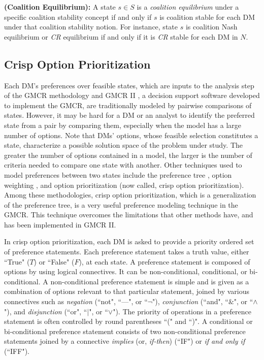 \begin{definition}\label{def-ce}
\rm {\bf (Coalition Equilibrium):} A state $s \in S$ is a \emph{coalition equilibrium} under a specific coalition stability concept if and only if $s$ is coalition stable for each DM under that coalition stability notion. For instance, state $s$ is coalition Nash equilibrium or \emph{CR} equilibrium if and only if it is \emph{CR} stable for each DM in $N$.
\end{definition}

\subsection{Crisp Option Prioritization}\label{crisp-opn-prioritization}

Each DM's preferences over feasible states, which are inputs to the analysis step of the GMCR methodology and GMCR II \citep{Peng1999, Fang-et-al2003}, a decision support software developed to implement the GMCR, are traditionally modeled by pairwise comparisons of states. However, it may be hard for a DM or an analyst to identify the preferred state from a pair by comparing them, especially when the model has a large number of options. Note that DMs' options, whose feasible selection constitutes a state, characterize a possible solution space of the problem under study. The greater the number of options contained in a model, the larger is the number of criteria needed to compare one state with another. Other techniques used to model preferences between two states include the preference tree \citep{Fraser1993, Fraser1994, Fraser&Hipel1988, Hipel&Meister1994}, option weighting \citep{Fang-et-al2003, Kilgour1997}, and option prioritization \citep{Peng-et-al1997, Peng1999, Fang-et-al2003} (now called, crisp option prioritization). Among these methodologies, crisp option prioritization, which is a generalization of the preference tree, is a very useful preference modeling technique in the GMCR. This technique overcomes the limitations that other methods have, and has been implemented in GMCR II.

In crisp option prioritization, each DM is asked to provide a priority ordered set of preference statements. Each preference statement takes a truth value, either ``True" ($T$) or ``False" ($F$), at each state. A preference statement is composed of options by using logical connectives. It can be non-conditional, conditional, or bi-conditional. A non-conditional preference statement is simple and is given as a combination of options relevant to that particular statement, joined by various connectives such as \emph{negation} (``not", ``---", or ``$\lnot$"), \emph{conjunction} (``and", ``$\&$", or ``$\land$"), and \emph{disjunction} (``or", ``$\mid$", or ``$\lor$"). The priority of operations in a preference statement is often controlled by round parentheses ``(" and ``)". A conditional or bi-conditional preference statement consists of two non-conditional preference statements joined by a connective \emph{implies} (or, \emph{if-then}) (``IF") or \emph{if and only if} (``IFF").

